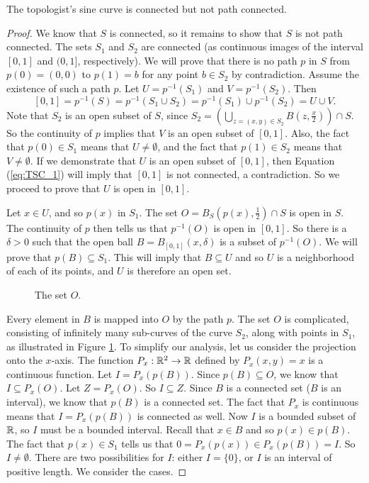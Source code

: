 \begin{theorem} The topologist's sine curve is connected but not path connected. 
\end{theorem}

\begin{proof} We know that $S$ is connected, so it remains to show that $S$ is not path connected. The sets $S_1$ and $S_2$ are connected (as continuous images of the interval $[0,1]$ and $(0,1]$, respectively). We will prove that there is no path $p$ in $S$ from $p(0) = (0,0)$ to $p(1) =  b$ for any point $b \in S_2$ by contradiction. Assume the existence of such a path $p$. Let $U = p^{-1}(S_1)$ and $V = p^{-1}(S_2)$. Then
\begin{equation} \label{eq:TSC_1}
[0,1] = p^{-1}(S) = p^{-1}(S_1 \cup S_2) = p^{-1}(S_1) \cup p^{-1}(S_2) = U \cup V.
\end{equation}
Note that $S_2$ is an open subset of $S$, since $S_2 = \left( \bigcup_{z = (x,y) \in S_2} B\left(z, \frac{x}{2}\right)\right) \cap S$. So the continuity of $p$ implies that $V$ is an open subset of $[0,1]$. Also, the fact that $p(0) \in S_1$ means that $U \neq \emptyset$, and the fact that $p(1) \in S_2$ means that $V \neq \emptyset$. If we demonstrate that $U$ is an open subset of $[0,1]$, then Equation (\ref{eq:TSC_1}) will imply that $[0,1]$ is not connected, a contradiction. So we proceed to prove that $U$ is open in $[0,1]$.

Let $x \in U$, and so $p(x)$ in $S_1$. The set $O = B_S\left(p(x), \frac{1}{2}\right) \cap S$ is open in $S$. The continuity of $p$ then tells us that $p^{-1}(O)$ is open in $[0,1]$. So there is a $\delta > 0$ such that the open ball $B=B_{[0,1]}(x, \delta)$ is a subset of $p^{-1}(O)$. We will prove that $p(B) \subseteq S_1$. This will imply that $B \subseteq U$ and so $U$ is a neighborhood of each of its points, and $U$ is therefore an open set. 

\begin{figure}[h]
\begin{center}
\end{center}
\caption{The set $O$.}
\label{F:TSC_O}
\end{figure}
Every element in $B$ is mapped into $O$ by the path $p$. The set $O$ is complicated, consisting of infinitely many sub-curves of the curve $S_2$, along with points in $S_1$, as illustrated in Figure \ref{F:TSC_O}. To simplify our analysis, let us consider the projection onto the $x$-axis. The function $P_x : \mathbb{R}^2 \to \mathbb{R}$ defined by $P_x(x,y) = x$ is a continuous function. Let $I = P_x(p(B))$. Since $p(B) \subseteq O$, we know that $I \subseteq P_x(O)$. Let $Z = P_x(O)$. So $I \subseteq Z$. Since $B$ is a connected set ($B$ is an interval), we know that $p(B)$ is a connected set. The fact that $P_x$ is continuous means that $I = P_x(p(B))$ is connected as well. Now $I$ is a bounded subset of $\mathbb{R}$, so $I$ must be a bounded interval. Recall that $x \in B$ and so $p(x) \in p(B)$. The fact that $p(x) \in S_1$ tells us that $0 = P_x(p(x)) \in P_x(p(B)) = I$. So $I \neq \emptyset$. There are two possibilities for $I$: either $I = \{0\}$, or $I$ is an interval of positive length. We consider the cases.


\end{proof}

